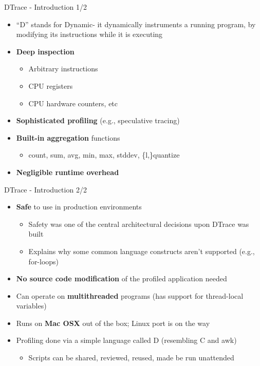 \documentclass{beamer}
\begin{document}
\begin{frame}{DTrace - Introduction 1/2}
\begin{itemize}
\item ``D'' stands for Dynamic- it dynamically instruments a running program,
by modifying its instructions while it is executing
\item {\bf Deep inspection}
\begin{itemize}
\item Arbitrary instructions
\item CPU registers
\item CPU hardware counters, etc
\end{itemize}
\item {\bf Sophisticated profiling} (e.g., speculative tracing)
\item {\bf Built-in aggregation} functions
\begin{itemize}
\item count, sum, avg, min, max, stddev, \{l,\}quantize
\end{itemize}

\item {\bf Negligible runtime overhead}
\end{itemize}
\end{frame}

\begin{frame}{DTrace - Introduction 2/2}
\begin{itemize}
\item {\bf Safe} to use in production environments
\begin{itemize}
\item Safety was one of the central architectural decisions upon DTrace was built
\item Explains why some common language constructs aren't supported (e.g., for-loops)
\end{itemize}

\item {\bf No source code modification} of the profiled application needed
\item Can operate on {\bf multithreaded} programs (has support for thread-local variables)
\item Runs on {\bf Mac OSX} out of the box; Linux port is on the way
\item Profiling done via a simple language called D (resembling C and awk)
\begin{itemize}
\item Scripts can be shared, reviewed, reused, made be run unattended
\end{itemize}
\end{itemize}
\end{frame}
\end{document}
